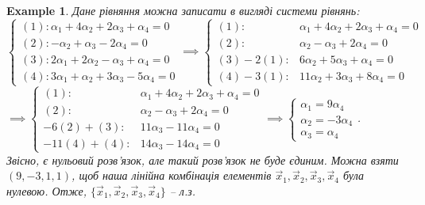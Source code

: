 \documentclass[a4paper, 10pt]{article}
\theoremstyle{theoremdd}
\newtheorem{example}[theorem]{Example}
\begin{document}
\begin{example}
	Дане рівняння можна записати в вигляді системи рівнянь:\\
	$\begin{cases}
	(1): \alpha_1 + 4\alpha_2 + 2\alpha_3 + \alpha_4 = 0\\
	(2): -\alpha_2 + \alpha_3 - 2\alpha_4 = 0\\
	(3): 2\alpha_1 + 2\alpha_2 - \alpha_3 + \alpha_4 = 0\\
	(4): 3\alpha_1 + \alpha_2 + 3\alpha_3 - 5\alpha_4 = 0
	\end{cases} \implies \begin{cases}
	(1): & \alpha_1 + 4\alpha_2 + 2\alpha_3 + \alpha_4 = 0\\
	(2): & \alpha_2 - \alpha_3 + 2\alpha_4 = 0\\
	(3)-2(1): & 6\alpha_2 + 5\alpha_3 + \alpha_4 = 0\\
	(4)-3(1): & 11\alpha_2 + 3\alpha_3 + 8\alpha_4 = 0
	\end{cases}$\\
	
	$\implies \begin{cases}
	(1): & \alpha_1 + 4\alpha_2 + 2\alpha_3 + \alpha_4 = 0\\
	(2): & \alpha_2 - \alpha_3 + 2\alpha_4 = 0\\
	-6(2)+(3): & 11\alpha_3 - 11\alpha_4 = 0\\
	-11(4)+(4): & 14\alpha_3 - 14\alpha_4 = 0
	\end{cases} 
	\implies
	\begin{cases}
	\alpha_1 = 9\alpha_4\\
	\alpha_2 = -3\alpha_4\\
	\alpha_3 = \alpha_4
	\end{cases} 
	$.\\
	Звісно, є нульовий розв'язок, але такий розв'язок не буде єдиним. Можна взяти $(9,-3,1,1)$, щоб наша лінійна комбінація елементів $\vec{x}_1,\vec{x}_2,\vec{x}_3,\vec{x}_4$ була нулевою. Отже, $\{\vec{x}_1,\vec{x}_2,\vec{x}_3,\vec{x}_4\}$ -- л.з.
	\end{example}
	
\end{document}
